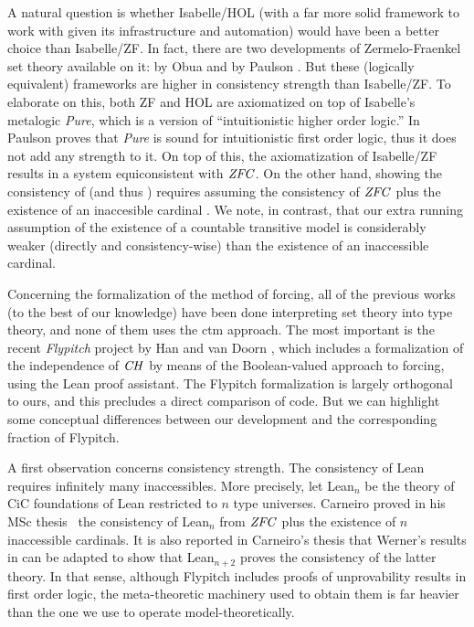 A natural question is whether Isabelle/HOL (with a far more solid
framework to work with given its infrastructure and automation) would
have been a better choice than Isabelle/ZF. In fact,
there are two developments of Zermelo-Fraenkel set theory available on
it:  by Obua \cite{DBLP:conf/ictac/Obua06} and
 by Paulson
\cite{ZFC_in_HOL-AFP}. But these (logically equivalent) frameworks are
higher in consistency strength than Isabelle/ZF. To elaborate on this,
both ZF and HOL are axiomatized on top of Isabelle's metalogic
\emph{Pure}, which is a version of ``intuitionistic higher order
logic.'' In  \cite{Paulson1989} Paulson proves that \emph{Pure}
is sound for intuitionistic first order logic, thus it does not add
any strength to it. On top of this, the axiomatization of Isabelle/ZF
results in a system equiconsistent with $\mathit{ZFC}$. On the other hand,
showing the consistency of  (and thus
) requires
assuming the consistency of $\mathit{ZFC}$ plus the existence of an
inaccesible cardinal \cite[Sect.~3]{DBLP:conf/ictac/Obua06}. We note,
in contrast, that our extra running assumption of the existence of a
countable transitive model is considerably weaker (directly and
consistency-wise) than the existence of an inaccessible cardinal.

Concerning the formalization of the method 
of forcing, all of the previous works (to the best of our knowledge)
have been done interpreting set theory into type theory, and
none of them uses the ctm approach. The
most important is the recent \emph{Flypitch} project  by 
Han and van Doorn
\cite{han_et_al:LIPIcs:2019:11074,DBLP:conf/cpp/HanD20}, which includes
a formalization of the independence of $\mathit{CH}$ by means of
the Boolean-valued approach to forcing, using the Lean
proof assistant. The Flypitch
formalization is largely orthogonal to ours, and this
precludes a direct comparison of code. But we can
highlight some conceptual differences between our development and the
corresponding fraction of Flypitch.

A first observation concerns consistency strength. The consistency of
Lean requires infinitely many inaccessibles. More precisely, let
Lean$_n$ be the theory of CiC foundations of Lean restricted to $n$
type universes.  Carneiro proved in his MSc thesis~\cite{carneiro-ms-thesis} the consistency of Lean$_n$ from $\mathit{ZFC}$ plus
the existence of $n$ inaccessible cardinals. It is also reported in
Carneiro's thesis that Werner's results in
\cite{10.5555/645869.668660} can be adapted to show that Lean$_{n+2}$
proves the consistency of the latter theory.  In that sense, although
Flypitch includes proofs of unprovability results in first order
logic, the meta-theoretic machinery used to obtain them is far heavier
than the one we use to operate model-theoretically.

